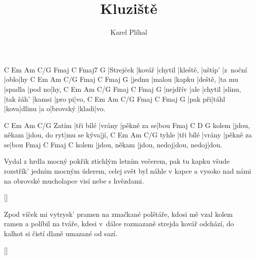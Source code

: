 \documentclass{song}
\author{Karel Plíhal}
\title{Kluziště}
\begin{document}
\strophe
C         Em\7   Am\7    C/G      Fmaj\7  C        Fmaj7 G
|Strejček |kovář |chytil |kleště, |uštíp' |z~noční |oblo|hy
C      Em\7   Am\7   C/G     Fmaj\7 C       Fmaj\7 G
|jednu |malou |kapku |deště, |ta mu |spadla |pod no|hy,
C        Em\7 Am\7    C/G     Fmaj\7    C      Fmaj\7 G
|nejdřív |ale |chytil |slinu, |tak šáh' |kamsi |pro pi|vo,
C       Em\7  Am\7 C/G    Fmaj\7 C     Fmaj\7 G
|pak při|táhl |kova|dlinu |a o|brovský |kladi|vo.
\endstrophe

      C         Em\7   Am\7        C/G
Zatím |tři bílé |vrány |pěkně za se|bou
      Fmaj\7       C            D\7        G
kolem |jdou, někam |jdou, do ryt|mu se kýva|jí,
      C         Em\7   Am\7        C/G
tyhle |tři bílé |vrány |pěkně za se|bou
      Fmaj\7       C           Fmaj\7     C
kolem |jdou, někam |jdou, nedoj|dou, nedoj|dou.
\endstrophe

\strophe*
Vydal z hrdla mocný pokřik ztichlým letním večerem,
pak tu kapku všude rozstřík' jedním mocným úderem,
celej svět byl náhle v kapce a vysoko nad námi
na obrovské mucholapce visí nebe s hvězdami.
\endstrophe

\ref{}

\strophe*
Zpod víček mi vytrysk' pramen na zmačkané polštáře,
kdosi mě vzal kolem ramen a políbil na tváře,
kdesi v~dálce rozmazaně strejda kovář odchází,
do kalhot si čistí dlaně umazané od sazí.
\endstrophe

\ref{}
\end{document}

